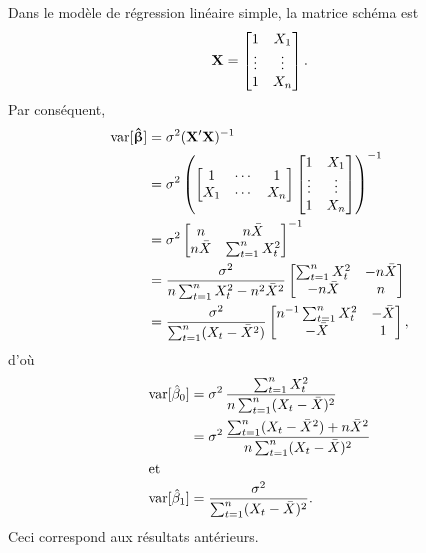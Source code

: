 \begin{solution}{3.3}
    Dans le modèle de régression linéaire simple, la matrice schéma est
    \begin{displaymath}
      \mathbf{X} =
      \begin{bmatrix}
        1      & X_1    \\
        \vdots & \vdots \\
        1      & X_n
      \end{bmatrix}.
    \end{displaymath}
    Par conséquent,
    \begin{align*}
      \mathrm{var} [ \boldsymbol{\hat{\upbeta}} ]
      &= \sigma^2 (\mathbf{X}^\prime \mathbf{X})^{-1} \\
      &= \sigma^2
      \left(
        \begin{bmatrix}
          1   & \cdots & 1  \\
          X_1 & \cdots & X_n
        \end{bmatrix}
        \begin{bmatrix}
          1      & X_1    \\
          \vdots & \vdots \\
          1      & X_n
        \end{bmatrix}
      \right)^{-1} \\
      &= \sigma^2
      \begin{bmatrix}
        n         & n \bar{X}        \\
        n \bar{X} & \sum_{t=1}^n X_t^2
      \end{bmatrix}^{-1}\\
      &= \frac{\sigma^2}{n \sum_{t=1}^n X_t^2 - n^2 \bar{X}^2}
      \begin{bmatrix}
        \sum_{t=1}^n X_t^2 & -n \bar{X} \\
        -n \bar{X}        & n
      \end{bmatrix} \\
      &= \frac{\sigma^2}{\sum_{t=1}^n (X_t - \bar{X}^2)}
      \begin{bmatrix}
        n^{-1} \sum_{t=1}^n X_t^2 & -\bar{X} \\
        -\bar{X}                 & 1
      \end{bmatrix},
    \end{align*}
    d'où
    \begin{align*}
      \var{\hat{\beta}_0}
      &= \sigma^2\, \frac{\sum_{t=1}^n X_t^2}{%
        n \sum_{t=1}^n (X_t - \bar{X})^2} \\
      &= \sigma^2\, \frac{\sum_{t=1}^n (X_t - \bar{X}^2) + n \bar{X}^2}{%
        n \sum_{t=1}^n (X_t - \bar{X})^2} \\
      \intertext{et}
      \var{\hat{\beta}_1}
      &= \frac{\sigma^2}{\sum_{t=1}^n (X_t - \bar{X})^2}.
    \end{align*}
    Ceci correspond aux résultats antérieurs.
  
\end{solution}
